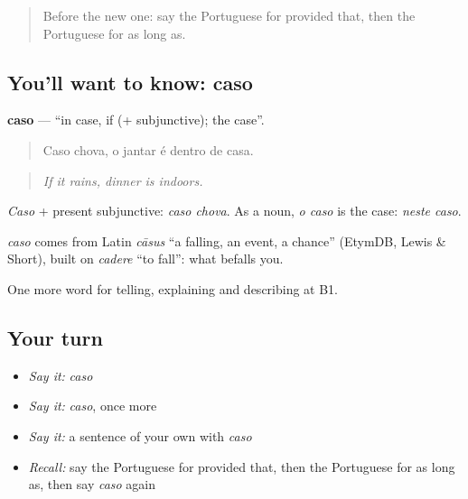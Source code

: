 \label{lesson:PT-C369-caso}



\begin{quote}
Before the new one: say the Portuguese for provided that, then the Portuguese for as long as.
\end{quote}

\subsection*{You'll want to know: caso}
\textbf{caso} — \textquotedblleft{}in case, if (+ subjunctive); the case\textquotedblright{}.

\begin{quote}
Caso chova, o jantar é dentro de casa.
\end{quote}

\begin{quote}
\emph{If it rains, dinner is indoors.}
\end{quote}

\emph{Caso} + present subjunctive: \emph{caso chova}. As a noun, \emph{o caso} is the case: \emph{neste caso}.

\begin{cousinweb}
\emph{caso} comes from Latin \emph{cāsus} \textquotedblleft{}a falling, an event, a chance\textquotedblright{} (EtymDB, Lewis \& Short), built on \emph{cadere} \textquotedblleft{}to fall\textquotedblright{}: what befalls you.
\end{cousinweb}

\begin{grammarlens}[title={What you've built}]
One more word for telling, explaining and describing at B1.
\end{grammarlens}

\subsection*{Your turn}
\begin{itemize}
\raggedright
  \item \emph{Say it:} \emph{caso}
  \item \emph{Say it:} \emph{caso}, once more
  \item \emph{Say it:} a sentence of your own with \emph{caso}
  \item \emph{Recall:} say the Portuguese for provided that, then the Portuguese for as long as, then say \emph{caso} again
\end{itemize}

